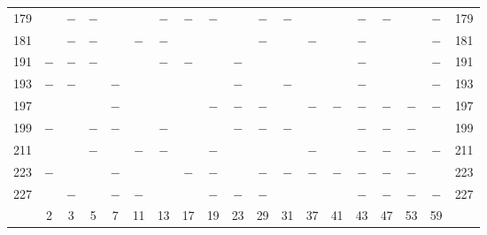 \begin{center}
\begin{tabular}{r|c|c|c|c|c|c|c|c|c|c|c|c|c|c|c|c|c|r}
179 &  & $-$ & $-$ &  &  & $-$ & $-$ & $-$ &  & $-$ & $-$ &  &  & $-$ & $-$ &  & $-$ & 179\\
181 &  & $-$ & $-$ &  & $-$ & $-$ &  &  &  & $-$ &  & $-$ &  & $-$ &  &  & $-$ & 181\\
191 & $-$ & $-$ & $-$ &  &  & $-$ & $-$ &  & $-$ &  &  &  &  & $-$ &  &  & $-$ & 191\\
193 & $-$ & $-$ &  & $-$ &  &  &  &  & $-$ &  & $-$ &  &  & $-$ &  &  & $-$ & 193\\
197 &  &  &  & $-$ &  &  &  & $-$ & $-$ & $-$ &  & $-$ & $-$ & $-$ & $-$ & $-$ & $-$ & 197\\
199 & $-$ &  & $-$ & $-$ &  & $-$ &  &  & $-$ & $-$ & $-$ &  &  & $-$ & $-$ & $-$ &  & 199\\
211 &  &  & $-$ &  & $-$ & $-$ &  & $-$ &  &  &  & $-$ &  & $-$ & $-$ & $-$ & $-$ & 211\\
223 & $-$ &  &  & $-$ &  &  & $-$ & $-$ &  & $-$ & $-$ & $-$ & $-$ & $-$ & $-$ & $-$ &  & 223\\
227 &  & $-$ &  & $-$ & $-$ &  &  & $-$ & $-$ & $-$ &  &  &  & $-$ & $-$ & $-$ & $-$ & 227\\
\hline
 & 2 & 3 & 5 & 7 & 11 & 13 & 17 & 19 & 23 & 29 & 31 & 37 & 41 & 43 & 47 & 53 & 59 & \\
\hline
\end{tabular}\endgroup\end{center}
\clearpage

